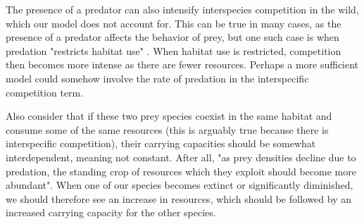The presence of a predator can also intensify interspecies competition in the wild, which our model does not account for. This can be true in many cases, as the presence of a predator affects the behavior of prey, but one such case is when predation "restricts habitat use" \cite{KotlerTwoInteractions}. When habitat use is restricted, competition then becomes more intense as there are fewer resources. Perhaps a more sufficient model could somehow involve the rate of predation in the interspecific competition term. 

Also consider that if these two prey species coexist in the same habitat and consume some of the same resources (this is arguably true because there is interspecific competition), their carrying capacities should be somewhat interdependent, meaning not constant. After all, "as prey densities
decline due to predation, the standing crop of resources which they exploit should become more abundant"\cite{KotlerTwoInteractions}. When one of our species becomes extinct or significantly diminished, we should therefore see an increase in resources, which should be followed by an increased carrying capacity for the other species. 